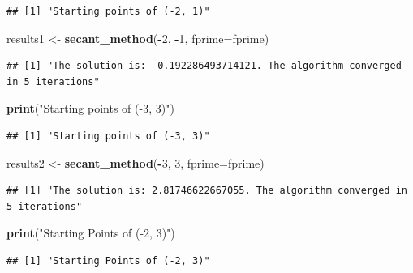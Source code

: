 \documentclass[]{article}
\newenvironment{Shaded}{\begin{snugshade}}{\end{snugshade}}
\newcommand{\KeywordTok}[1]{\textcolor[rgb]{0.13,0.29,0.53}{\textbf{#1}}}
\newcommand{\DataTypeTok}[1]{\textcolor[rgb]{0.13,0.29,0.53}{#1}}
\newcommand{\DecValTok}[1]{\textcolor[rgb]{0.00,0.00,0.81}{#1}}
\newcommand{\StringTok}[1]{\textcolor[rgb]{0.31,0.60,0.02}{#1}}
\newcommand{\OperatorTok}[1]{\textcolor[rgb]{0.81,0.36,0.00}{\textbf{#1}}}
\newcommand{\NormalTok}[1]{#1}
\begin{document}
\begin{verbatim}
## [1] "Starting points of (-2, 1)"
\end{verbatim}

\begin{Shaded}
\begin{Highlighting}[]
\NormalTok{results1 <-}\StringTok{ }\KeywordTok{secant_method}\NormalTok{(}\OperatorTok{-}\DecValTok{2}\NormalTok{, }\OperatorTok{-}\DecValTok{1}\NormalTok{, }\DataTypeTok{fprime=}\NormalTok{fprime)}
\end{Highlighting}
\end{Shaded}

\begin{verbatim}
## [1] "The solution is: -0.192286493714121. The algorithm converged in 5 iterations"
\end{verbatim}

\begin{Shaded}
\begin{Highlighting}[]
\KeywordTok{print}\NormalTok{(}\StringTok{"Starting points of (-3, 3)"}\NormalTok{)}
\end{Highlighting}
\end{Shaded}

\begin{verbatim}
## [1] "Starting points of (-3, 3)"
\end{verbatim}

\begin{Shaded}
\begin{Highlighting}[]
\NormalTok{results2 <-}\StringTok{ }\KeywordTok{secant_method}\NormalTok{(}\OperatorTok{-}\DecValTok{3}\NormalTok{, }\DecValTok{3}\NormalTok{, }\DataTypeTok{fprime=}\NormalTok{fprime)}
\end{Highlighting}
\end{Shaded}

\begin{verbatim}
## [1] "The solution is: 2.81746622667055. The algorithm converged in 5 iterations"
\end{verbatim}

\begin{Shaded}
\begin{Highlighting}[]
\KeywordTok{print}\NormalTok{(}\StringTok{"Starting Points of (-2, 3)"}\NormalTok{)}
\end{Highlighting}
\end{Shaded}

\begin{verbatim}
## [1] "Starting Points of (-2, 3)"
\end{verbatim}
\end{document}
